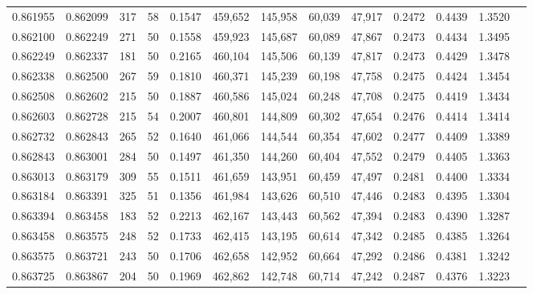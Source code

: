 \begin{tabular}{rrrrrrrrrrrrr}
0.861955 & 0.862099 &   317 &  58 &                                     0.1547 & 459,652 & 145,958 &  60,039 &  47,917 & 0.2472 & 0.4439 & 1.3520 \\
0.862100 & 0.862249 &   271 &  50 &                                     0.1558 & 459,923 & 145,687 &  60,089 &  47,867 & 0.2473 & 0.4434 & 1.3495 \\
0.862249 & 0.862337 &   181 &  50 &                                     0.2165 & 460,104 & 145,506 &  60,139 &  47,817 & 0.2473 & 0.4429 & 1.3478 \\
0.862338 & 0.862500 &   267 &  59 &                                     0.1810 & 460,371 & 145,239 &  60,198 &  47,758 & 0.2475 & 0.4424 & 1.3454 \\
0.862508 & 0.862602 &   215 &  50 &                                     0.1887 & 460,586 & 145,024 &  60,248 &  47,708 & 0.2475 & 0.4419 & 1.3434 \\
0.862603 & 0.862728 &   215 &  54 &                                     0.2007 & 460,801 & 144,809 &  60,302 &  47,654 & 0.2476 & 0.4414 & 1.3414 \\
0.862732 & 0.862843 &   265 &  52 &                                     0.1640 & 461,066 & 144,544 &  60,354 &  47,602 & 0.2477 & 0.4409 & 1.3389 \\
0.862843 & 0.863001 &   284 &  50 &                                     0.1497 & 461,350 & 144,260 &  60,404 &  47,552 & 0.2479 & 0.4405 & 1.3363 \\
0.863013 & 0.863179 &   309 &  55 &                                     0.1511 & 461,659 & 143,951 &  60,459 &  47,497 & 0.2481 & 0.4400 & 1.3334 \\
0.863184 & 0.863391 &   325 &  51 &                                     0.1356 & 461,984 & 143,626 &  60,510 &  47,446 & 0.2483 & 0.4395 & 1.3304 \\
0.863394 & 0.863458 &   183 &  52 &                                     0.2213 & 462,167 & 143,443 &  60,562 &  47,394 & 0.2483 & 0.4390 & 1.3287 \\
0.863458 & 0.863575 &   248 &  52 &                                     0.1733 & 462,415 & 143,195 &  60,614 &  47,342 & 0.2485 & 0.4385 & 1.3264 \\
0.863575 & 0.863721 &   243 &  50 &                                     0.1706 & 462,658 & 142,952 &  60,664 &  47,292 & 0.2486 & 0.4381 & 1.3242 \\
0.863725 & 0.863867 &   204 &  50 &                                     0.1969 & 462,862 & 142,748 &  60,714 &  47,242 & 0.2487 & 0.4376 & 1.3223 \\

\end{tabular}
